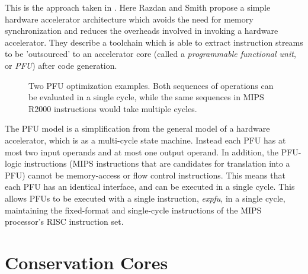 \documentclass{UoYCSproject}
\begin{document}
This is the approach taken in \cite{high-performance-microarchitecture}. Here Razdan and Smith propose a simple
hardware accelerator architecture which avoids the need for memory synchronization and reduces the overheads involved in
invoking a hardware accelerator. They describe a toolchain which is able to extract instruction streams to be 'outsourced' to an
accelerator core (called a \textit{programmable functional unit}, or \textit{PFU}) after code generation.

\begin{figure}[hbt]
\caption{Two PFU optimization examples. Both sequences of operations can be evaluated in a single cycle, while the same sequences in MIPS R2000 instructions would take multiple cycles. \cite{high-performance-microarchitecture}}
\end{figure}

The PFU model is a simplification from the general model of a hardware accelerator, which is as a multi-cycle state machine.
Instead each PFU has at most two input operands and at most one output operand. In addition, the PFU-logic instructions (MIPS
instructions that are candidates for translation into a PFU) cannot be memory-access or flow control instructions. This means
that each PFU has an identical interface, and can be executed in a single cycle. This allows PFUs to be executed with a single
instruction, \textit{expfu}, in a single cycle, maintaining the fixed-format and single-cycle instructions of the MIPS
processor's RISC instruction set.

\section{Conservation Cores}
\end{document}
